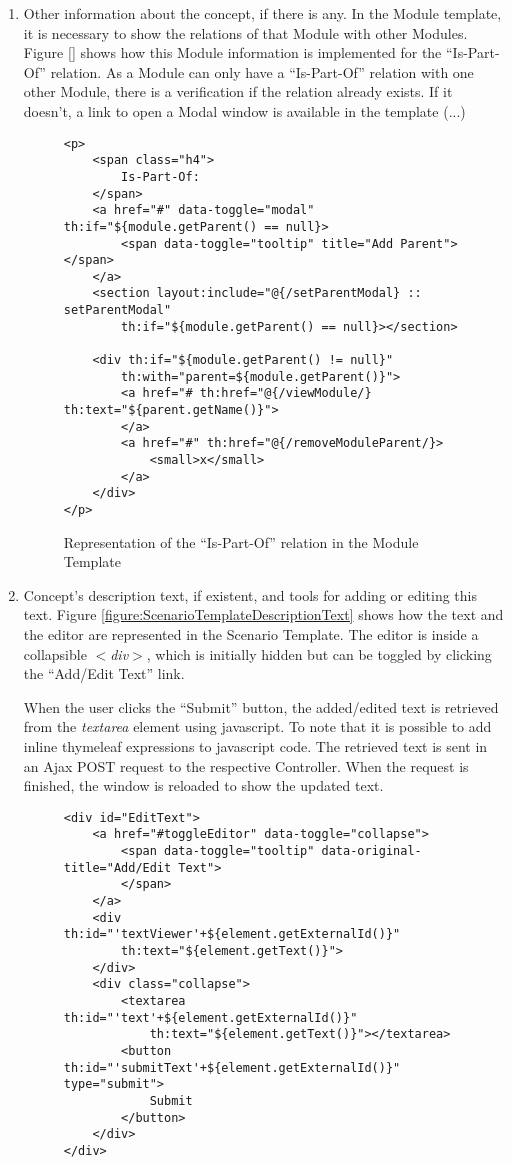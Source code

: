 \begin{enumerate}
\item Other information about the concept, if there is any. In the Module template, it is necessary to show the relations of that Module with other Modules. Figure \ref{} shows how this Module information is implemented for the ``Is-Part-Of'' relation. As a Module can only have a ``Is-Part-Of'' relation with one other Module, there is a verification if the relation already exists. If it doesn't, a link to open a Modal window is available in the template (...)
\begin{figure}[h]
\lstset{style=customhtml}
\begin{lstlisting}
<p>
	<span class="h4">
		Is-Part-Of:
	</span>
	<a href="#" data-toggle="modal" th:if="${module.getParent() == null}>
		<span data-toggle="tooltip" title="Add Parent"></span>
	</a>
	<section layout:include="@{/setParentModal} :: setParentModal" 
		th:if="${module.getParent() == null}></section>
		
	<div th:if="${module.getParent() != null}" 
		th:with="parent=${module.getParent()}">
		<a href="# th:href="@{/viewModule/} th:text="${parent.getName()}">
		</a>
		<a href="#" th:href="@{/removeModuleParent/}>
			<small>x</small>
		</a>
	</div>  
</p>	
\end{lstlisting}
\caption{Representation of the ``Is-Part-Of'' relation in the Module Template}
\label{figure:ModuleTemplateRelation}
\end{figure}


\item Concept's description text, if existent, and tools for adding or editing this text. Figure \ref{figure:ScenarioTemplateDescriptionText} shows how the text and the editor are represented in the Scenario Template. The editor is inside a collapsible \textit{$<$div$>$}, which is initially hidden but can be toggled by clicking the ``Add/Edit Text'' link.

When the user clicks the ``Submit'' button, the added/edited text is retrieved from the \textit{textarea} element using javascript. To note that it is possible to add inline thymeleaf expressions to javascript code. The retrieved text is sent in an Ajax POST request to the respective Controller. When the request is finished, the window is reloaded to show the updated text.
\begin{figure}[h]
\lstset{style=customhtml}
\begin{lstlisting}
<div id="EditText">
	<a href="#toggleEditor" data-toggle="collapse"> 
		<span data-toggle="tooltip" data-original-title="Add/Edit Text">
		</span>
	</a>
	<div th:id="'textViewer'+${element.getExternalId()}" 
		th:text="${element.getText()}">
	</div>
	<div class="collapse">
		<textarea  th:id="'text'+${element.getExternalId()}" 
			th:text="${element.getText()}"></textarea>
		<button th:id="'submitText'+${element.getExternalId()}" type="submit">
			Submit
		</button>
	</div>
</div>
	

\end{lstlisting}
\end{figure}
\end{enumerate}
